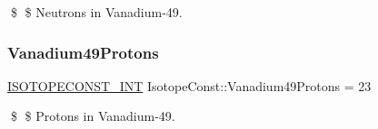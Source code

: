 \$ \$ Neutrons in Vanadium-\/49. \mbox{\label{group___isotope_const-_vanadium-_v49_ga87ee31298609e190da028cf11a8457a9}} 
\subsubsection{\texorpdfstring{Vanadium49\+Protons}{Vanadium49Protons}}
{\footnotesize\ttfamily \mbox{\hyperlink{group___isotope_const-_macros_ga5f18360b3e99483a35c32d789e62621c}{I\+S\+O\+T\+O\+P\+E\+C\+O\+N\+S\+T\+\_\+\+I\+NT}} Isotope\+Const\+::\+Vanadium49\+Protons = 23}

\$ \$ Protons in Vanadium-\/49. 